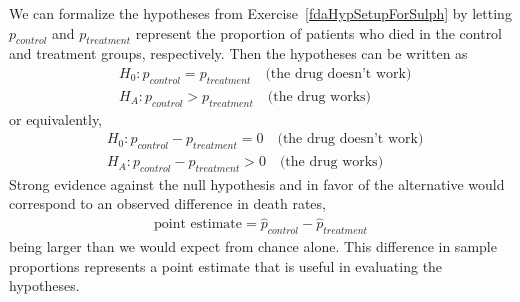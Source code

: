 We can formalize the hypotheses from Exercise~\ref{fdaHypSetupForSulph} by letting $p_{control}$ and $p_{treatment}$ represent the proportion of patients who died in the control and treatment groups, respectively. Then the hypotheses can be written as
\begin{eqnarray*}
&&H_0: p_{control} = p_{treatment} \quad\text{(the drug doesn't work)} \quad \\
&&H_A: p_{control} > p_{treatment} \quad\text{(the drug works)}
\end{eqnarray*}
or equivalently,
\begin{eqnarray*}
&&H_0: p_{control} - p_{treatment} = 0 \quad\text{(the drug doesn't work)} \quad \\
&&H_A: p_{control} - p_{treatment} > 0 \quad\text{(the drug works)}
\end{eqnarray*}
Strong evidence against the null hypothesis and in favor of the alternative would correspond to an observed difference in death rates,
\begin{eqnarray*}
\text{point estimate} = \hat{p}_{control} - \hat{p}_{treatment}
\end{eqnarray*}
being larger than we would expect from chance alone. This difference in sample proportions represents a point estimate that is useful in evaluating the hypotheses. 


